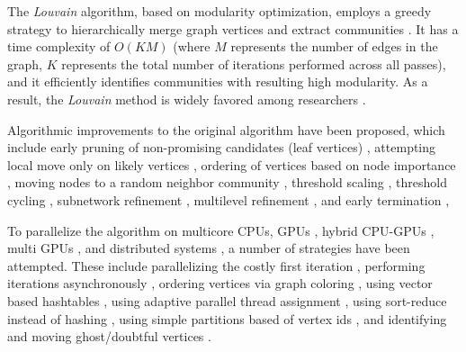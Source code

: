 The \textit{Louvain} algorithm, based on modularity optimization, employs a greedy strategy to hierarchically merge graph vertices and extract communities \cite{com-blondel08}. It has a time complexity of $O(KM)$ (where $M$ represents the number of edges in the graph, $K$ represents the total number of iterations performed across all passes), and it efficiently identifies communities with resulting high modularity. As a result, the \textit{Louvain} method is widely favored among researchers \cite{com-lancichinetti09}.

Algorithmic improvements to the original algorithm have been proposed, which include early pruning of non-promising candidates (leaf vertices) \cite{com-ryu16, com-halappanavar17, com-zhang21, com-you22}, attempting local move only on likely vertices \cite{com-ryu16, com-ozaki16, com-zhang21, com-shi21}, ordering of vertices based on node importance \cite{com-aldabobi22}, moving nodes to a random neighbor community \cite{com-traag15}, threshold scaling \cite{com-lu15, com-naim17, com-halappanavar17}, threshold cycling \cite{com-ghosh18}, subnetwork refinement \cite{com-waltman13, com-traag19}, multilevel refinement \cite{com-rotta11, com-gach14, com-shi21}, and early termination \cite{com-ghosh18},

To parallelize the algorithm on multicore CPUs, GPUs \cite{com-cheong13}, hybrid CPU-GPUs \cite{com-bhowmik19}, multi GPUs \cite{com-cheong13, com-gawande22, com-bhowmick22}, and distributed systems \cite{com-bhowmick22}, a number of strategies have been attempted. These include parallelizing the costly first iteration \cite{com-wickramaarachchi14}, performing iterations asynchronously \cite{com-que15, com-shi21}, ordering vertices via graph coloring \cite{com-halappanavar17}, using vector based hashtables \cite{com-halappanavar17}, using adaptive parallel thread assignment \cite{com-fazlali17, com-naim17, com-mohammadi20}, using sort-reduce instead of hashing \cite{com-cheong13}, using simple partitions based of vertex ids \cite{com-cheong13, com-ghosh18}, and identifying and moving ghost/doubtful vertices \cite{com-zeng15, com-que15, com-bhowmik19, com-bhowmick22}.






